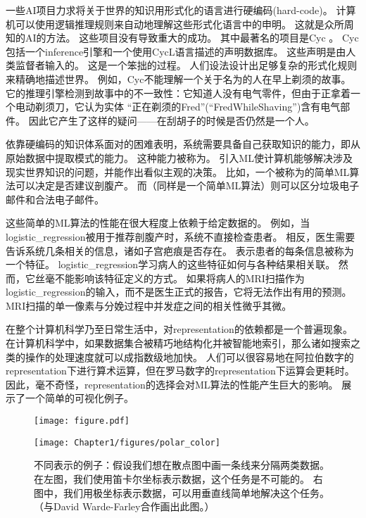 一些\gls{AI}项目力求将关于世界的知识用形式化的语言进行硬编码(hard-code)。
计算机可以使用逻辑推理规则来自动地理解这些形式化语言中的申明。
这就是众所周知的\gls{AI}的方法。
这些项目没有导致重大的成功。
其中最著名的项目是Cyc \citep{Lenat-1989-book}。
Cyc包括一个\gls{inference}引擎和一个使用CycL语言描述的声明数据库。
这些声明是由人类监督者输入的。
这是一个笨拙的过程。
人们设法设计出足够复杂的形式化规则来精确地描述世界。
例如，Cyc不能理解一个关于名为的人在早上剃须的故事\citep{MachineChangedWorld}。
它的推理引擎检测到故事中的不一致性：它知道人没有电气零件，但由于正拿着一个电动剃须刀，它认为实体
``正在剃须的Fred''(``FredWhileShaving'')含有电气部件。
因此它产生了这样的疑问——在刮胡子的时候是否仍然是一个人。

依靠硬编码的知识体系面对的困难表明，系统需要具备自己获取知识的能力，即从原始数据中提取模式的能力。
这种能力被称为。
引入\gls{ML}使计算机能够解决涉及现实世界知识的问题，并能作出看似主观的决策。
比如，一个被称为的简单\gls{ML}算法可以决定是否建议剖腹产\citep{MorYosef90}。
而（同样是一个简单\gls{ML}算法）则可以区分垃圾电子邮件和合法电子邮件。


这些简单的\gls{ML}算法的性能在很大程度上依赖于给定数据的。
例如，当\gls{logistic_regression}被用于推荐剖腹产时，系统不直接检查患者。
相反，医生需要告诉系统几条相关的信息，诸如子宫疤痕是否存在。
表示患者的每条信息被称为一个特征。
\gls{logistic_regression}学习病人的这些特征如何与各种结果相关联。
然而，它丝毫不能影响该特征定义的方式。
如果将病人的MRI扫描作为\gls{logistic_regression}的输入，而不是医生正式的报告，它将无法作出有用的预测。
MRI扫描的单一像素与分娩过程中并发症之间的相关性微乎其微。

在整个计算机科学乃至日常生活中，对\gls{representation}的依赖都是一个普遍现象。
在计算机科学中，如果数据集合被精巧地结构化并被智能地索引，那么诸如搜索之类的操作的处理速度就可以成指数级地加快。
人们可以很容易地在阿拉伯数字的\gls{representation}下进行算术运算，但在罗马数字的\gls{representation}下运算会更耗时。
因此，毫不奇怪，\gls{representation}的选择会对\gls{ML}算法的性能产生巨大的影响。
展示了一个简单的可视化例子。

\begin{figure}[!htb]
\ifOpenSource
\centerline{\texttt{[image: figure.pdf]}}
\else
\centerline{\texttt{[image: Chapter1/figures/polar\_color]}}
\fi
\caption{不同表示的例子：假设我们想在散点图中画一条线来分隔两类数据。
在左图，我们使用笛卡尔坐标表示数据，这个任务是不可能的。 
右图中，我们用极坐标表示数据，可以用垂直线简单地解决这个任务。（与David Warde-Farley合作画出此图。）}
\label{fig:chap1_polar}
\end{figure}

